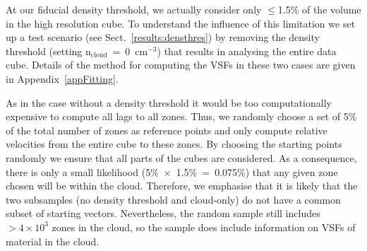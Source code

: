 At our fiducial density threshold, we actually consider only $\leq$1.5\% of the volume in the high resolution cube.
To understand the influence of this limitation we set up a test scenario (see Sect.~\ref{results:densthres}) by removing the density threshold (setting n$_\mathrm{cloud}$~=~0~cm$^{-3}$) that results in analysing the entire data cube.
Details of the method for computing the VSFs in these two cases are given in Appendix~\ref{appFitting}.

As in the case without a density threshold it would be too computationally expensive to compute all lags to all zones.
Thus, we randomly choose a set of 5\% of the total number of zones as reference points and only compute relative velocities from the entire cube to these zones.
By choosing the starting points randomly we ensure that all parts of the cubes are considered. 
As a consequence, there is only a small likelihood (5\%~$\times$~1.5\%~=~0.075\%) that any given zone chosen will be within the cloud.
Therefore, we emphasise that it is likely that the two subsamples (no density threshold and cloud-only) do not have a common subset of starting vectors.
Nevertheless, the random sample still includes $>4 \times 10^3$ zones in the cloud, so the sample does include information on VSFs of material in the cloud.

\endinput
